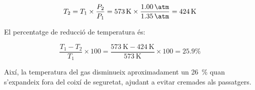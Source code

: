 {\begin{enumerate}
    \begin{equation}
        T_2 = T_1 \times \frac{P_2}{P_1}
 = \qty{573}{\kelvin} \times \frac{\qty{1.00}{\atm}}{\qty{1.35}{\atm}}
= \qty{424}{\kelvin}
    \end{equation}
    
    El percentatge de reducció de temperatura és:
    
    \begin{equation}
        \frac{T_1 - T_2}{T_1} \times 100 = \frac{\qty{573}{\kelvin} - \qty{424}{\kelvin}}{\qty{573}{\kelvin}} \times 100 = 25.9\%
    \end{equation}
    
    Així, la temperatura del gas disminueix aproximadament un \qty{26}{\percent} quan s'expandeix fora del coixí de seguretat, ajudant a evitar cremades als passatgers.
\end{enumerate}
}
